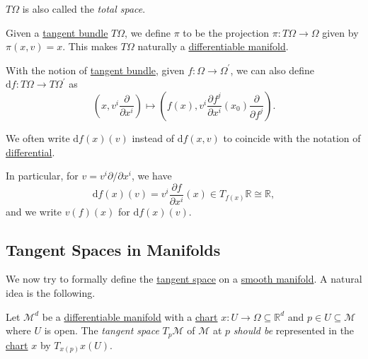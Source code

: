 \begin{note}
	\(T \Omega \) is also called the \emph{total space}.
\end{note}

\begin{remark}
	Given a \hyperref[def:tangent-bundle-of-Euclidean-space]{tangent bundle} \(T \Omega \), we define \(\pi \) to be the projection \(\pi \colon T \Omega \to \Omega\) given by \(\pi (x, v) = x\). This makes \(T \Omega \) naturally a \hyperref[def:smooth-manifold]{differentiable manifold}.
\end{remark}

With the notion of \hyperref[def:tangent-bundle-of-Euclidean-space]{tangent bundle}, given \(f\colon \Omega \to \Omega ^\prime \), we can also define \(\mathrm{d} f\colon T \Omega \to T \Omega ^\prime \) as
\[
	\left( x, v^i \frac{\partial }{\partial x^i} \right) \mapsto \left( f(x), v^i \frac{\partial f^j}{\partial x^i} (x_0) \frac{\partial }{\partial f^j} \right).
\]

\begin{notation}
	We often write \(\mathrm{d} f(x)(v)\) instead of \(\mathrm{d} f(x, v)\) to coincide with the notation of \hyperref[def:differential-of-Euclidean-space]{differential}.
\end{notation}

In particular, for \(v = v^i \partial / \partial x^i\), we have
\[
	\mathrm{d} f(x)(v) = v^i \frac{\partial f}{\partial x^i} (x)\in T_{f(x)}\mathbb{R} \cong \mathbb{R},
\]
and we write \(v(f)(x)\) for \(\mathrm{d} f(x)(v)\).

\subsection{Tangent Spaces in Manifolds}
We now try to formally define the \hyperref[def:tangent-space]{tangent space} on a \hyperref[def:smooth-manifold]{smooth manifold}. A natural idea is the following.

\begin{intuition}
	Let \(\mathcal{M}^d \) be a \hyperref[def:smooth-manifold]{differentiable manifold} with a \hyperref[def:coordinate-chart]{chart} \(x\colon U \to \Omega \subseteq \mathbb{R} ^d\) and \(p\in U \subseteq \mathcal{M} \) where \(U\) is open. The \emph{tangent space} \(T_p \mathcal{M} \) of \(\mathcal{M} \) at \(p\) \emph{should be} represented in the \hyperref[def:coordinate-chart]{chart} \(x\) by \(T_{x(p)}x(U)\).
\end{intuition}

